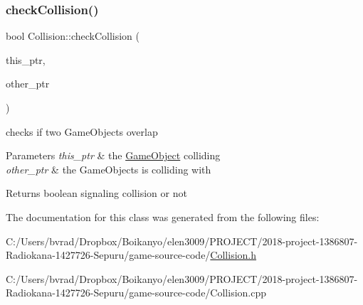 \subsubsection{\texorpdfstring{check\+Collision()}{checkCollision()}}
{\footnotesize\ttfamily bool Collision\+::check\+Collision (\begin{DoxyParamCaption}\item[{shared\+\_\+ptr$<$ \mbox{\hyperlink{class_game_object}{Game\+Object}} $>$}]{this\+\_\+ptr,  }\item[{shared\+\_\+ptr$<$ \mbox{\hyperlink{class_game_object}{Game\+Object}} $>$}]{other\+\_\+ptr }\end{DoxyParamCaption})}



checks if two Game\+Objects overlap 


\begin{DoxyParams}{Parameters}
{\em this\+\_\+ptr} & the \mbox{\hyperlink{class_game_object}{Game\+Object}} colliding \\
\hline
{\em other\+\_\+ptr} & the Game\+Objects is colliding with \\
\hline
\end{DoxyParams}
\begin{DoxyReturn}{Returns}
boolean signaling collision or not 
\end{DoxyReturn}


The documentation for this class was generated from the following files\+:\begin{DoxyCompactItemize}
\item 
C\+:/\+Users/bvrad/\+Dropbox/\+Boikanyo/elen3009/\+P\+R\+O\+J\+E\+C\+T/2018-\/project-\/1386807-\/\+Radiokana-\/1427726-\/\+Sepuru/game-\/source-\/code/\mbox{\hyperlink{_collision_8h}{Collision.\+h}}\item 
C\+:/\+Users/bvrad/\+Dropbox/\+Boikanyo/elen3009/\+P\+R\+O\+J\+E\+C\+T/2018-\/project-\/1386807-\/\+Radiokana-\/1427726-\/\+Sepuru/game-\/source-\/code/Collision.\+cpp\end{DoxyCompactItemize}
